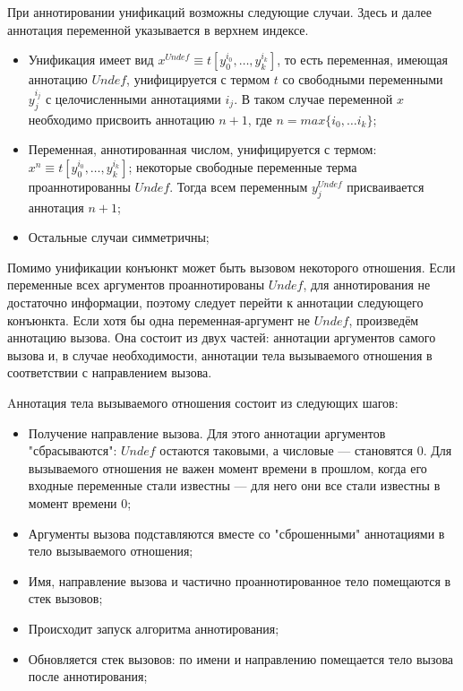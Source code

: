 При аннотировании унификаций возможны следующие случаи. 
Здесь и далее аннотация переменной указывается в верхнем индексе.
\begin{itemize}
    \item Унификация имеет вид $x^{Undef} \equiv t[y_0^{i_0}, \dots, y_k^{i_k}]$, то есть переменная, имеющая аннотацию $Undef$, унифицируется с термом $t$ со свободными переменными $y_j^{i_j}$ с целочисленными аннотациями $i_j$. В таком случае переменной $x$ необходимо присвоить аннотацию $n + 1$, где $n = max \{ i_0, \dots i_k\}$;
    \item Переменная, аннотированная числом, унифицируется с термом: $x^{n} \equiv t[y_0^{i_0}, \dots, y_k^{i_k}]$; некоторые свободные переменные терма проаннотированны $Undef$.
    Тогда всем переменным $y_j^{Undef}$ присваивается аннотация $n+1$;
    \item Остальные случаи симметричны;
\end{itemize}

Помимо унификации конъюнкт может быть вызовом некоторого отношения.
Если переменные всех аргументов проаннотированы $Undef$, для аннотирования не достаточно информации, поэтому следует перейти к аннотации следующего конъюнкта.
Если хотя бы одна переменная-аргумент не $Undef$, произведём аннотацию вызова.
Она состоит из двух частей: аннотации аргументов самого вызова и, в случае необходимости, аннотации тела вызываемого отношения в соответствии с направлением вызова.

Aннотация тела вызываемого отношения состоит из следующих шагов:
\begin{itemize}
    \item Получение направление вызова. Для этого аннотации аргументов "сбрасываются": $Undef$ остаются таковыми, а числовые --- становятся $0$. Для вызываемого отношения не важен момент времени в прошлом, когда его входные переменные стали известны --- для него они все стали известны в момент времени $0$;
    \item Аргументы вызова подставляются вместе со "сброшенными" аннотациями в тело вызываемого отношения;
    \item Имя, направление вызова и частично проаннотированное тело помещаются в стек вызовов;
    \item Происходит запуск алгоритма аннотирования;
    \item Обновляется стек вызовов: по имени и направлению помещается тело вызова после аннотирования;
\end{itemize}

